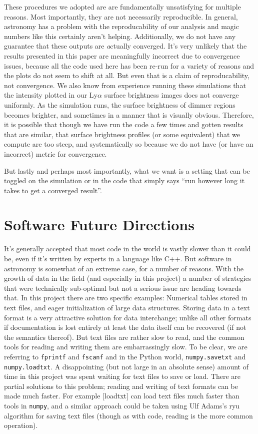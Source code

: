 These procedures we adopted are are fundamentally unsatisfying for multiple reasons.
Most importantly, they are not necessarily reproducible.
In general, astronomy has a problem with the reproducability of our analysis and magic numbers like this certainly aren't helping.
Additionally, we do not have any guarantee that these outputs are {\emph actually} converged.
It's very unlikely that the results presented in this paper are meaningfully incorrect due to convergence issues, because all the code used here has been re-run for a variety of reasons and the plots do not seem to shift at all.
But even that is a claim of reproducability, not convergence.
We also know from experience running these simulations that the intensity plotted in our Ly$\alpha$ surface brightness images does not converge uniformly.
As the simulation runs, the surface brightness of dimmer regions becomes brighter, and sometimes in a manner that is visually obvious.
Therefore, it is possible that though we have run the code a few times and gotten results that are similar, that surface brightness profiles (or some equivalent) that we compute are too steep, and systematically so because we do not have (or have an incorrect) metric for convergence.

But lastly and perhaps most importantly, what we want is a setting that can be toggled on the simulation or in the code that simply says ``run however long it takes to get a converged result''.

\section{Software Future Directions}

It's generally accepted that most code in the world is vastly slower than it could be, even if it's written by experts in a language like C++.
But software in astronomy is somewhat of an extreme case, for a number of reasons.
With the growth of data in the field (and especially in this project) a number of strategies that were technically sub-optimal but not a serious issue are heading towards that.
In this project there are two specific examples: Numerical tables stored in text files, and eager initialization of large data structures.
Storing data in a text format is a very attractive solution for data interchange; unlike all other formats if documentation is lost entirely at least the data itself can be recovered (if not the semantics thereof).
But text files are rather slow to read, and the common tools for reading and writing them are embarrassingly slow. To be clear, we are referring to \lstinline{fprintf} and \lstinline{fscanf} and in the Python world, \lstinline{numpy.savetxt} and \lstinline{numpy.loadtxt}.
A disappointing (but not large in an absolute sense) amount of time in this project was spent waiting for text files to save or load.
There are partial solutions to this problem; reading and writing of text formats can be made much faster.
For example \href{https://github.com/saethlin/loadtxt}[loadtxt] can load text files much faster than tools in \lstinline{numpy}, and a similar approach could be taken using Ulf Adams's ryu algorithm for saving text files (though as with code, reading is the more common operation).


